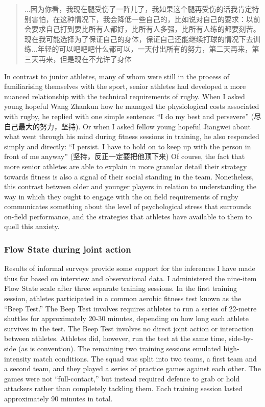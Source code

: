 \begin{CJK}{UTF8}{gbsn}
\begin{quote}
      ...因为你看，我现在腿受伤了一阵儿了，我如果这个腿再受伤的话我肯定特别害怕，在这种情况下，我会降低一些自己的，比如说对自己的要求：以前会要求自己打到要比所有人都好，比所有人多强，比所有人练的都要刻苦。现在我可能选择为了保证自己的身体，保证自己还能继续打球的情况下去训练...年轻的可以吧吧吧什么都可以，一天付出所有的努力，第二天再来，第三天再来，但是现在不允许了身体
\end{quote}

In contrast to junior athletes, many of whom were still in the process of familiarising themselves with the sport, senior athletes had developed a more nuanced relationship with the technical requirements of rugby.  When I asked young hopeful Wang Zhankun how he managed the physiological costs associated with rugby, he replied with one simple sentence: ``I do my best and persevere'' (尽自己最大的努力，坚持). Or when I asked fellow young hopeful Jiangwei about what went through his mind during fitness sessions in training, he also responded simply and directly: ``I persist. I have to hold on to keep up with the person in front of me anyway'' (坚持，反正一定要把他顶下来) Of course, the fact that more senior athletes are able to explain in more granular detail their strategy towards fitness is also a signal of their social standing in the team.  Nonetheless, this contrast between older and younger players in relation to understanding the way in which they ought to engage with the on field requirements of rugby communicates something about the level of psychological stress that surrounds on-field performance, and the strategies that athletes have available to them to quell this anxiety.



\subsubsection{Flow State during joint action}

Results of informal surveys provide some support for the inferences I have made thus far based on interview and observational data.  I administered the nine-item Flow State scale after three separate training sessions.  In the first training session, athletes participated in a common aerobic fitness test known as the ``Beep Test.''  The Beep Test involves requires athletes to run a series of 22-metre shuttles for approximately 20-30 minutes, depending on how long each athlete survives in the test.  The Beep Test involves no direct joint action or interaction between athletes.  Athletes did, however, run the test at the same time, side-by-side (as is convention).  The remaining two training sessions emulated high-intensity match conditions.  The squad was split into two teams, a first team and a second team, and they played a series of practice games against each other.  The games were not ``full-contact,'' but instead required defence to grab or hold attackers rather than completely tackling them. Each training session lasted approximately 90 minutes in total.


\end{CJK}
